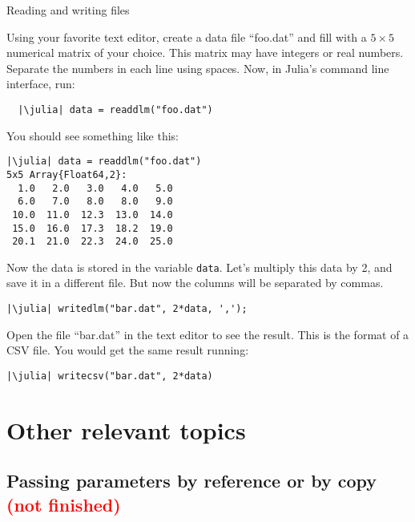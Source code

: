 \begin{example}{Reading and writing files}
\label{ex:reading}

Using your favorite text editor, create a data file ``foo.dat'' and fill with a $5\times5$ numerical matrix of your choice. This matrix may have integers or real numbers.
Separate the numbers in each line using spaces. Now, in Julia's command line interface, run:

\vspace*{0.3cm}

\begin{verbatim}
  |\julia| data = readdlm("foo.dat")
\end{verbatim}

You should see something like this:

\begin{verbatim}
|\julia| data = readdlm("foo.dat")
5x5 Array{Float64,2}:
  1.0   2.0   3.0   4.0   5.0
  6.0   7.0   8.0   8.0   9.0
 10.0  11.0  12.3  13.0  14.0
 15.0  16.0  17.3  18.2  19.0
 20.1  21.0  22.3  24.0  25.0
\end{verbatim}

Now the data is stored in the variable \texttt{data}. Let's multiply this data by 2, and save it in a different file. But now the columns will be separated by commas.

\begin{verbatim}
|\julia| writedlm("bar.dat", 2*data, ',');
\end{verbatim}

Open the file ``bar.dat'' in the text editor to see the result. This is the format of a CSV file. You would get the same result running: 

\begin{verbatim}
|\julia| writecsv("bar.dat", 2*data)
\end{verbatim}
\end{example}



\section{Other relevant topics}

\subsection{Passing parameters by reference or by copy \textcolor{red}{(not finished)}}

